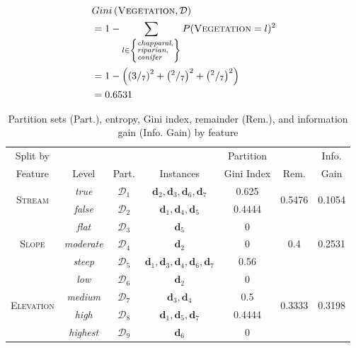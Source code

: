 \documentclass[xcolor={table}]{beamer}
\newcommand{\featN}[1]{\textsc{#1}}
\newcommand{\featL}[1]{\textit{#1}}
\begin{document}
 \begin{frame} 
\begin{equation*}
	\begin{alignedat}{2}
&Gini\left(\featN{Vegetation},\mathcal{D}\right)\\
&= 1 - \sum_{l \in  \left\{ \begin{subarray}{1} \featL{chapparal}, \\ \featL{riparian}, \\ \featL{conifer} \end{subarray} \right\}} P(\featN{Vegetation}=l)^2\\
		&= 1- \left( \left(3/_7\right)^2 + \left( ^2/_7\right)^2 + \left( ^2/_7\right)^2 \right)\\
		&= 0.6531
	\end{alignedat}
\end{equation*}
\end{frame} 

 \begin{frame} 
\begin{table}
\caption{Partition sets (Part.), entropy, Gini index, remainder (Rem.), and information gain (Info. Gain) by feature}
\label{tab:giniindexsplits}
\centering
\begin{scriptsize}
\begin{tabular}{ccccccc}
\hline
Split by &  &              &  & Partition &  & Info.\\
Feature & Level & Part.  & Instances & Gini Index & Rem. & Gain\\
\hline
\multirow{2}{*}{\featN{Stream}} & \featL{true} & $\mathcal{D}_1$  & $\mathbf{d}_2,\mathbf{d}_3,\mathbf{d}_6,\mathbf{d}_7$ & 0.625 & \multirow{2}{*}{0.5476} & \multirow{2}{*}{0.1054}\\
 & \featL{false} & $\mathcal{D}_2$ & $\mathbf{d}_1,\mathbf{d}_4,\mathbf{d}_5$ & 0.4444 &  & \\
\hline

\multirow{3}{*}{\featN{Slope}} & \featL{flat} & $\mathcal{D}_3$ & $\mathbf{d}_5$  & 0 & \multirow{3}{*}{0.4} & \multirow{3}{*}{0.2531}\\
& \featL{moderate} & $\mathcal{D}_4$ & $\mathbf{d}_2$ & 0 &  & \\
& \featL{steep} & $\mathcal{D}_5$ & $\mathbf{d}_1,\mathbf{d}_3,\mathbf{d}_4,\mathbf{d}_6,\mathbf{d}_7$ & 0.56 &  & \\

\hline
\multirow{4}{*}{\featN{Elevation}} & \featL{low} & $\mathcal{D}_6$ & $\mathbf{d}_2$  & 0 & \multirow{4}{*}{0.3333} & \multirow{4}{*}{0.3198}\\
 & \featL{medium} & $\mathcal{D}_7$ & $\mathbf{d}_3,\mathbf{d}_4$ & 0.5 &  & \\
 & \featL{high} & $\mathcal{D}_8$ & $\mathbf{d}_1,\mathbf{d}_5,\mathbf{d}_7$ & 0.4444 &  & \\
 & \featL{highest} & $\mathcal{D}_9$ & $\mathbf{d}_6$ & 0 &  & \\
\hline
\end{tabular}
\end{scriptsize}
\end{table}
\end{frame} 
\end{document}
